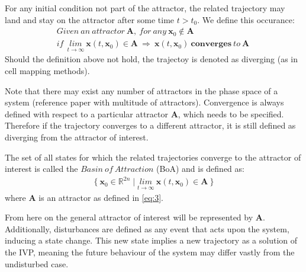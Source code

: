     For any initial condition not part of the attractor, the related trajectory may land and stay on the attractor after some time $t > t_0$. We define this occurance: 
    \begin{gather} Given\ an\ attractor\ \mathbf{A},\ for\ any\ \mathbf{x}_0 \notin \mathbf{A}\\ if\ \ \underset{t \rightarrow \infty}{lim} \ \mathbf{x}(t,\mathbf{x}_0) \in \mathbf{A}\ \Rightarrow\
    \mathbf{x}(t,\mathbf{x}_0)\ \mathbf{converges}\ to\ \mathbf{A}\ \label{eq:5} \end{gather}
    Should the definition above not hold, the trajectoy is denoted as diverging (as in cell mapping methods). 

    Note that there may exist any number of attractors in the phase space of a system (reference paper with multitude of attractors). Convergence is always defined with respect to a particular attractor $\mathbf{A}$, which needs to be specified. Therefore if the trajectory converges to a different attractor, it is still defined as diverging from the attractor of interest.  

    The set of all states for which the related trajectories converge to the attractor of interest is called the $Basin\ of\ Attraction$ (BoA) and is defined as: 
    \begin{gather} \{\ \mathbf{x}_0 \in \mathbb{R}^{2n} \mid  \underset{t \rightarrow \infty}{lim} \ \mathbf{x}(t,\mathbf{x}_0) \in \mathbf{A}\ \}\end{gather}
    where $\mathbf{A}$ is an attractor as defined in \ref{eq:3}.

    From here on the general attractor of interest will be represented by $\mathbf{A}$.
    Additionally, disturbances are defined as any event that acts upon the system, inducing a state change. This new state implies a new trajectory as a solution of the IVP, meaning the future behaviour of the system may differ vastly from the undisturbed case.





